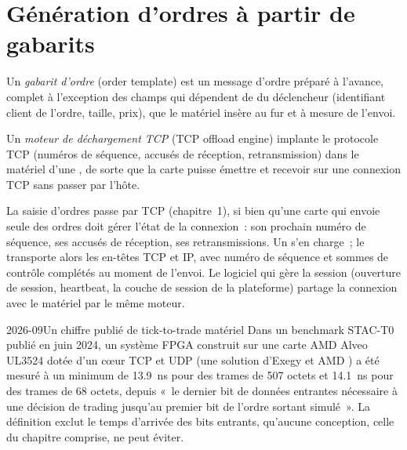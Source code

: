 \section{Génération d'ordres à partir de gabarits}

\begin{definition}\label{def:nw:programmable-hardware-ii-trading-designs:template}
Un \emph{gabarit d'ordre} (order template) est un message d'ordre préparé à l'avance, complet à l'exception des champs qui dépendent de
du déclencheur (identifiant client de l'ordre, taille, prix), que le matériel insère au fur et à mesure de l'envoi.
\end{definition}

\begin{definition}\label{def:nw:programmable-hardware-ii-trading-designs:toe}
Un \emph{moteur de déchargement TCP} (TCP offload engine) implante le protocole TCP (numéros de séquence, accusés de réception, retransmission)
dans le matériel d'une , de sorte que la carte puisse émettre et recevoir sur une connexion TCP sans passer par l'hôte.
\end{definition}

La saisie d'ordres passe par TCP (chapitre~1), si bien qu'une carte qui envoie seule des ordres doit gérer l'état de la connexion~: son prochain
numéro de séquence, ses accusés de réception, ses retransmissions. Un  s'en charge~; le  transporte alors les en-têtes TCP et
IP, avec numéro de séquence et sommes de contrôle complétés au moment de l'envoi. Le logiciel qui gère la session (ouverture de session, heartbeat, la
couche de session de la plateforme) partage la connexion avec le matériel par le même moteur.

\begin{dated}{2026-09}{Un chiffre publié de tick-to-trade matériel}\label{dat:nw:programmable-hardware-ii-trading-designs:stac}
Dans un benchmark STAC-T0 publié en juin 2024, un système FPGA construit sur une carte AMD Alveo UL3524 dotée d'un cœur TCP et UDP (une solution d'Exegy et AMD
) a été mesuré à un minimum de \qty{13.9}{\nano\second} pour des trames de 507 octets et \qty{14.1}{\nano\second} pour des trames de 68 octets, depuis
«~le dernier bit de données entrantes nécessaire à une décision de trading jusqu'au premier bit de l'ordre sortant simulé~». La définition
exclut le temps d'arrivée des bits entrants, qu'aucune conception, celle du chapitre comprise, ne peut éviter.
\end{dated}


